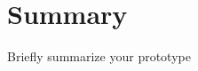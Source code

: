 \documentclass[
10pt, %
a4paper, %
oneside, %
headinclude,footinclude, %
BCOR5mm, %
]{scrartcl}
\title{\spacedallcaps{Project Name}} %
\author{\small{Team Member 1, Team Member 2}} %
\date{\today} %
\begin{document}

\renewcommand{\sectionmark}[1]{\markright{\spacedlowsmallcaps{#1}}} %
\lehead{\mbox{\llap{\small\thepage\kern1em\color{halfgray} \vline}\color{halfgray}\hspace{0.5em}\rightmark\hfil}} %

\pagestyle{scrheadings} %


\maketitle %

\setcounter{tocdepth}{2} %

\tableofcontents %




\section*{Summary} %

Briefly summarize your prototype

\end{document}
